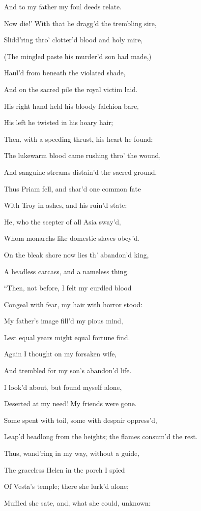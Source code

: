 And to my father my foul deeds relate.

Now die!’ With that he dragg’d the trembling sire,

Slidd’ring thro’ clotter’d blood and holy mire,

(The mingled paste his murder’d son had made,)

Haul’d from beneath the violated shade,

And on the sacred pile the royal victim laid.

His right hand held his bloody falchion bare,

His left he twisted in his hoary hair;

Then, with a speeding thrust, his heart he found:

The lukewarm blood came rushing thro’ the wound,

And sanguine streams distain’d the sacred ground.

Thus Priam fell, and shar’d one common fate

With Troy in ashes, and his ruin’d state:

He, who the scepter of all Asia sway’d,

Whom monarchs like domestic slaves obey’d.

On the bleak shore now lies th’ abandon’d king,

A headless carcass, and a nameless thing.

“Then, not before, I felt my curdled blood

Congeal with fear, my hair with horror stood:

My father’s image fill’d my pious mind,

Lest equal years might equal fortune find.

Again I thought on my forsaken wife,

And trembled for my son’s abandon’d life.

I look’d about, but found myself alone,

Deserted at my need! My friends were gone.

Some spent with toil, some with despair oppress’d,

Leap’d headlong from the heights; the flames consum’d the rest.

Thus, wand’ring in my way, without a guide,

The graceless Helen in the porch I spied

Of Vesta’s temple; there she lurk’d alone;

Muffled she sate, and, what she could, unknown:

